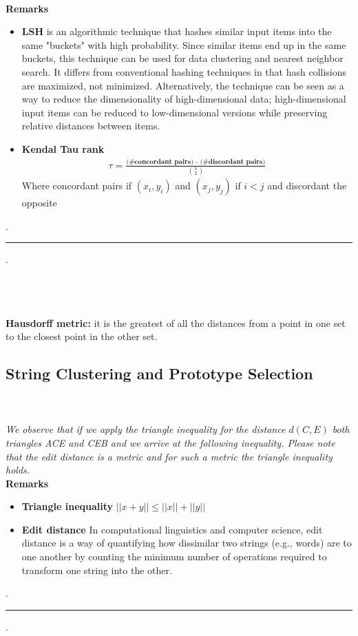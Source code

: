 \documentclass[
	12pt, %
]{fphw}
\begin{document}
\\
\textbf{Remarks}\
\begin{itemize}
    \item \textbf{LSH} is an algorithmic technique that hashes similar input items into the same "buckets" with high probability. Since similar items end up in the same buckets, this technique can be used for data clustering and nearest neighbor search. It differs from conventional hashing techniques in that hash collisions are maximized, not minimized. Alternatively, the technique can be seen as a way to reduce the dimensionality of high-dimensional data; high-dimensional input items can be reduced to low-dimensional versions while preserving relative distances between items.
    \item \textbf{Kendal Tau rank}
        \begin{align}
            \tau = \frac{\textbf{(#concordant pairs) - (#discordant pairs)}}{{n \choose 2}}
        \end{align}
        Where concordant pairs if $(x_i,y_i)$ and $(x_j,y_j)$ if $i<j$ and discordant the opposite\\
\end{itemize}
\begin{center}
    . \noindent\rule{5cm}{0.5pt} .
\end{center}
\\
\\
\\
\textbf{Hausdorff metric:}  it is the greatest of all the distances from a point in one set to the closest point in the other set.
\\
\subsection{String Clustering and Prototype Selection} 
\\
\textit{\\We observe that if we apply the triangle inequality for the distance $d(C,E)$ both triangles ACE and CEB and we arrive at the following inequality. Please note that the edit distance is a metric and for such a metric the triangle inequality holds.}
\\
\textbf{Remarks}\
\begin{itemize}
    \item \textbf{Triangle inequality} $||x+y|| \le ||x|| + ||y||$
    \item \textbf{ Edit distance} In computational linguistics and computer science, edit distance is a way of quantifying how dissimilar two strings (e.g., words) are to one another by counting the minimum number of operations required to transform one string into the other. 
\end{itemize}
\begin{center}
    . \noindent\rule{5cm}{0.5pt} .
\end{center}
\\
\end{document}
